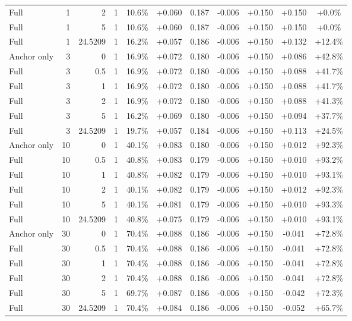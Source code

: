 \begin{table}[htbp]
\begin{tabular}{lrrrccccccc}
Full & 1 & 2 & 1 & 10.6\% & +0.060 & 0.187 & -0.006 & +0.150 & +0.150 & +0.0\% \\
Full & 1 & 5 & 1 & 10.6\% & +0.060 & 0.187 & -0.006 & +0.150 & +0.150 & +0.0\% \\
Full & 1 & 24.5209 & 1 & 16.2\% & +0.057 & 0.186 & -0.006 & +0.150 & +0.132 & +12.4\% \\
Anchor only & 3 & 0 & 1 & 16.9\% & +0.072 & 0.180 & -0.006 & +0.150 & +0.086 & +42.8\% \\
Full & 3 & 0.5 & 1 & 16.9\% & +0.072 & 0.180 & -0.006 & +0.150 & +0.088 & +41.7\% \\
Full & 3 & 1 & 1 & 16.9\% & +0.072 & 0.180 & -0.006 & +0.150 & +0.088 & +41.7\% \\
Full & 3 & 2 & 1 & 16.9\% & +0.072 & 0.180 & -0.006 & +0.150 & +0.088 & +41.3\% \\
Full & 3 & 5 & 1 & 16.2\% & +0.069 & 0.180 & -0.006 & +0.150 & +0.094 & +37.7\% \\
Full & 3 & 24.5209 & 1 & 19.7\% & +0.057 & 0.184 & -0.006 & +0.150 & +0.113 & +24.5\% \\
Anchor only & 10 & 0 & 1 & 40.1\% & +0.083 & 0.180 & -0.006 & +0.150 & +0.012 & +92.3\% \\
Full & 10 & 0.5 & 1 & 40.8\% & +0.083 & 0.179 & -0.006 & +0.150 & +0.010 & +93.2\% \\
Full & 10 & 1 & 1 & 40.8\% & +0.082 & 0.179 & -0.006 & +0.150 & +0.010 & +93.1\% \\
Full & 10 & 2 & 1 & 40.1\% & +0.082 & 0.179 & -0.006 & +0.150 & +0.012 & +92.3\% \\
Full & 10 & 5 & 1 & 40.1\% & +0.081 & 0.179 & -0.006 & +0.150 & +0.010 & +93.3\% \\
Full & 10 & 24.5209 & 1 & 40.8\% & +0.075 & 0.179 & -0.006 & +0.150 & +0.010 & +93.1\% \\
Anchor only & 30 & 0 & 1 & 70.4\% & +0.088 & 0.186 & -0.006 & +0.150 & -0.041 & +72.8\% \\
Full & 30 & 0.5 & 1 & 70.4\% & +0.088 & 0.186 & -0.006 & +0.150 & -0.041 & +72.8\% \\
Full & 30 & 1 & 1 & 70.4\% & +0.088 & 0.186 & -0.006 & +0.150 & -0.041 & +72.8\% \\
Full & 30 & 2 & 1 & 70.4\% & +0.088 & 0.186 & -0.006 & +0.150 & -0.041 & +72.8\% \\
Full & 30 & 5 & 1 & 69.7\% & +0.087 & 0.186 & -0.006 & +0.150 & -0.042 & +72.3\% \\
Full & 30 & 24.5209 & 1 & 70.4\% & +0.084 & 0.186 & -0.006 & +0.150 & -0.052 & +65.7\% \\

\end{tabular}
\end{table}
